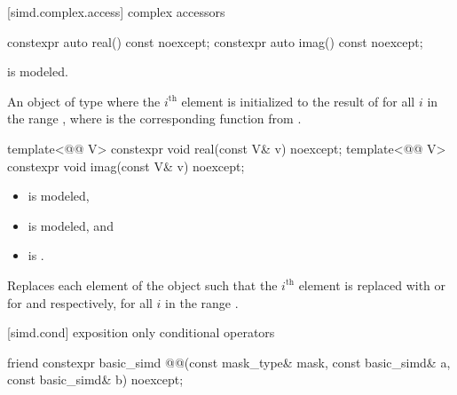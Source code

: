 [simd.complex.access]{ complex accessors}

\begin{itemdecl}
constexpr auto real() const noexcept;
constexpr auto imag() const noexcept;
\end{itemdecl}

\begin{itemdescr}
\pnum
\constraints
{} is modeled.

\pnum
\returns
An object of type 
where the $i^\text{th}$ element is initialized to the result of
 for all $i$ in the range
, where  is the corresponding function
from .
\end{itemdescr}

\begin{itemdecl}
template<@@ V>
  constexpr void real(const V& v) noexcept;
template<@@ V>
  constexpr void imag(const V& v) noexcept;
\end{itemdecl}

\begin{itemdescr}
\pnum
\constraints
\begin{itemize}
 \item
    is modeled,
 \item
   is modeled, and
 \item
    is .
\end{itemize}

\pnum
\effects
Replaces each element of the  object such that the
$i^\text{th}$ element is replaced with  or 
for  and  respectively, for all $i$ in the range .
\end{itemdescr}

[simd.cond]{ exposition only conditional operators}

\begin{itemdecl}
friend constexpr basic_simd
@@(const mask_type& mask, const basic_simd& a, const basic_simd& b) noexcept;
\end{itemdecl}


